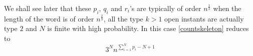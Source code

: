 \documentclass[12pt]{article}
\numberwithin{equation}{section}
\numberwithin{equation}{section}
\theoremstyle{definition}
\renewcommand{\1}{\bf 1}
\begin{document}
 We shall see later that these $p_{i}$, $q_{i}$ and $r_{i}$'s are typically of order $n^{\frac{1}{3}}$ when the length of the word is of order $n^{\frac{2}{3}}$, all the type $k>1$ open instants are actually type $2$ and $N$ is finite with high probability. In this case \eqref{countskeleton} reduces to 
\begin{equation}\label{countskeletontype2}
 3^{N} n^{\sum_{i=1}^{N}p_{i}- N+1}
\end{equation}
\end{document}

